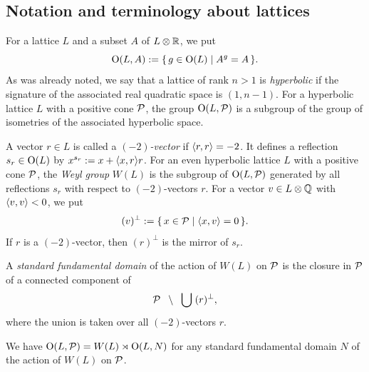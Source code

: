 \documentclass{amsart} %
\begin{document}
\subsection{Notation and terminology about lattices}\label{subsec:notationlat}
%
For a lattice $L$ and a subset $A$ of $L\otimes \mathord{\mathbb{R}}$,
we put
\[
\mathord{\mathrm{O}}(L, A):=\{\,{g\in \mathord{\mathrm{O}}(L)}\mid {A^g=A} \,\}.
\]
As was already noted,
we say that a lattice of rank $n>1$ is \emph{hyperbolic}
if the signature of the associated real quadratic space is $(1, n-1)$.
For a hyperbolic lattice $L$ with a positive cone $\mathord{\mathcal{P}}$,
the group
$\mathord{\mathrm{O}}(L, \mathord{\mathcal{P}})$ is a subgroup of the group of isometries of the associated hyperbolic space.
\par 
A vector $r\in L$ is called a \emph{$(-2)$-vector} if $\langle r, r \rangle=-2$.
It defines a reflection 
$s_r\in \mathord{\mathrm{O}}(L)$ by $x^{s_r}:=x+\langle x, r \rangle r$.
For an even hyperbolic lattice $L$ with a positive cone $\mathord{\mathcal{P}}$,
 the \emph{Weyl group} $W(L)$
is the subgroup of $\mathord{\mathrm{O}}(L, \mathord{\mathcal{P}})$
generated by all reflections $s_r$ with respect to $(-2)$-vectors $r$.
For a vector $v \in L\otimes\mathord{\mathbb{Q}}$ with $\langle v, v \rangle<0$,
we put 
\[
(v)^{\perp}:=\{\,{x\in \mathord{\mathcal{P}}}\mid {\langle x, v \rangle=0} \,\}.
\]
If $r$ is a $(-2)$-vector, then $(r)^\perp$ is the mirror of $s_r$.
%
\begin{definition}
A \emph{standard fundamental domain} of the action of $W(L)$ on $\mathord{\mathcal{P}}$
is the closure in $ \mathord{\mathcal{P}}$ of a connected component of 
\[
\mathord{\mathcal{P}}\;\;\setminus \;\;\bigcup\; (r)^{\perp}, 
\]
where the union is taken over all $(-2)$-vectors $r$.
\end{definition}
%
We have $\mathord{\mathrm{O}}(L, \mathord{\mathcal{P}})=W(L)\rtimes \mathord{\mathrm{O}}(L, N)$
for any standard fundamental domain $N$ of the action of $W(L)$ on $\mathord{\mathcal{P}}$.
%
\end{document}
